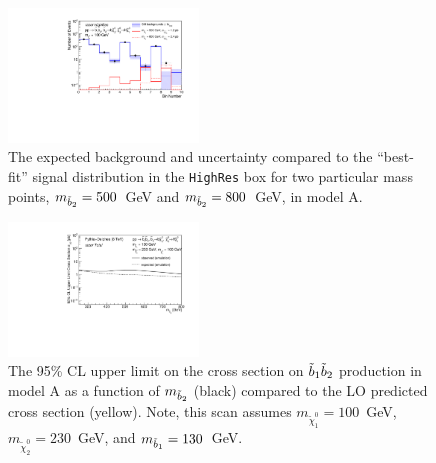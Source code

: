 
\begin{figure}[htb]
\includegraphics[width=0.45\textwidth]{figs/pheno/obsexp_T21bH_HighRes.pdf}
\caption{\label{fig:T21bHExpObs500800} The expected background and
  uncertainty compared to the ``best-fit'' signal distribution in the \texttt{HighRes} box for two particular
  mass points, $m_{\tilde{b}_2}=500$~GeV and $m_{\tilde{b}_2}=800$~GeV, in model A.}
\end{figure}

\begin{figure}[htb]
\includegraphics[width=0.45\textwidth]{figs/pheno/xsecUL_T21bH_130_100_Total.pdf}
\caption{\label{fig:T21bH1dLimit} The 95\% CL upper limit on the
  cross section on $\tilde{b}_1\tilde{b}_2$ production in model A as a function of $m_{\tilde{b}_2}$ (black) compared
  to the LO predicted cross section (yellow). Note, this scan assumes
  $m_{\tilde\chi_1^0}=100$~GeV, $m_{\tilde{\chi}_2^0}=230$~GeV, and  $m_{\tilde{b}_1}=130$~GeV.}
\end{figure}

